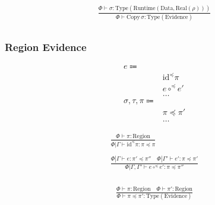 \documentclass {article}
\begin{document}
\begin{gather*}
\frac
{\Phi \vdash \sigma : \text{Type}(\text{Runtime}(\text{Data}, \text{Real}(\rho)))}
{\Phi \vdash \text{Copy} \, \sigma : \text{Type}(\text{Evidence})} \\
\end{gather*}


\subsubsection{Region Evidence}
\begin{align*}
e \Coloneqq & \\
& \text{id}^\preceq \pi \tag{SubType Identity Proof} \\
& e \circ^\preceq e' \tag{SubType Compose Proof} \\
& \dots \\
\sigma, \tau, \pi \Coloneqq & \\
& \pi \preceq \pi' \tag{Region Scoping} \\
& \dots
\end{align*}

\begin{gather*}
\frac
{\Phi \vdash \pi : \text{Region}}
{\Phi | \Gamma \vdash \text{id}^{\preceq} \pi : \pi \preceq \pi} \\
\\
\frac
{\Phi | \Gamma \vdash e : \pi' \preceq \pi'' \quad \Phi | \Gamma' \vdash e' : \pi \preceq \pi'}
{\Phi | \Gamma, \Gamma' \vdash e \circ^\preceq e' : \pi \preceq \pi''} \\
\end{gather*}

\begin{gather*}
\frac
{\Phi \vdash \pi : \text{Region} \quad \Phi \vdash \pi' : \text{Region}}
{\Phi \vdash \pi \preceq \pi' : \text{Type}(\text{Evidence})} \\
\end{gather*}
\end{document}
